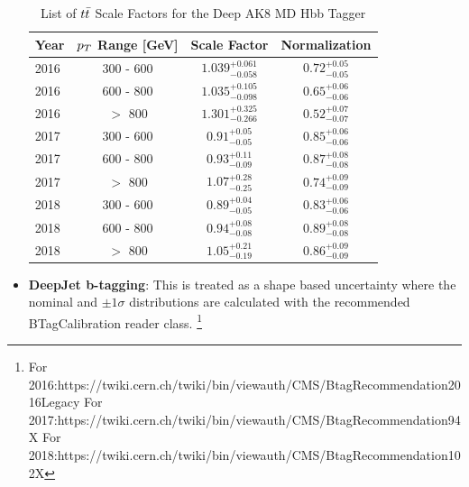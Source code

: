 \begin{itemize}
\begin{table}[htb]\footnotesize
  \begin{center}
    \caption{List of $t\bar{t} $ Scale Factors for the Deep AK8 MD Hbb Tagger}
    \begin{tabular}{l|c|c|c}
      \hline
      \hline
      Year & $p_{T}$ Range [GeV] & Scale Factor & Normalization \\
      \hline
      2016 & 300 - 600 & $1.039^{+0.061}_{-0.058}$ & $0.72^{+0.05}_{-0.05}$\\
      2016 & 600 - 800 & $1.035^{+0.105}_{-0.098}$ & $0.65^{+0.06}_{-0.06}$\\
      2016 & $>$ 800 & $1.301^{+0.325}_{-0.266}$ & $0.52^{+0.07}_{-0.07}$\\

      2017 & 300 - 600 & $0.91^{+0.05}_{-0.05}$ & $0.85^{+0.06}_{-0.06}$\\
      2017 & 600 - 800 & $0.93^{+0.11}_{-0.09}$ & $0.87^{+0.08}_{-0.08}$\\
      2017 & $>$ 800 & $1.07^{+0.28}_{-0.25}$ & $0.74^{+0.09}_{-0.09}$\\

      2018 & 300 - 600 & $0.89^{+0.04}_{-0.05}$ & $0.83^{+0.06}_{-0.06}$\\
      2018 & 600 - 800 & $0.94^{+0.08}_{-0.08}$ & $0.89^{+0.08}_{-0.08}$\\
      2018 & $>$ 800 & $1.05^{+0.21}_{-0.19}$ & $0.86^{+0.09}_{-0.09}$\\

      \hline
      \hline  
    \end{tabular}  
    \label{tab:dak8HbbSFs}
  \end{center}
\end{table}

\item \textbf{DeepJet b-tagging}: This is treated as a shape based uncertainty where the nominal and $\pm 1 \sigma$ distributions are calculated with the recommended BTagCalibration reader class. \footnote{For 2016:https://twiki.cern.ch/twiki/bin/viewauth/CMS/BtagRecommendation2016Legacy For 2017:https://twiki.cern.ch/twiki/bin/viewauth/CMS/BtagRecommendation94X For 2018:https://twiki.cern.ch/twiki/bin/viewauth/CMS/BtagRecommendation102X }

  

\end{itemize}
